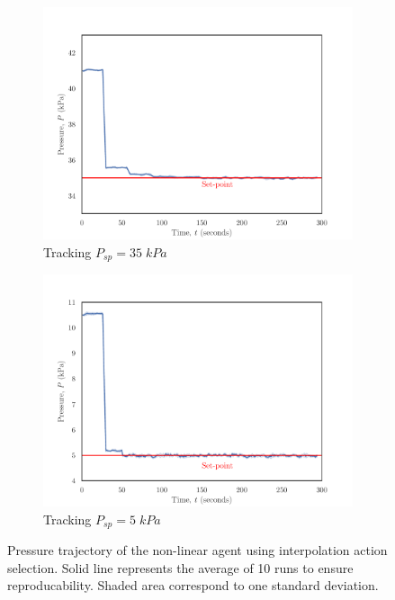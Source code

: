 \begin{figure}[H]
     \centering
     \begin{subfigure}{0.49\textwidth}
         \centering
         \includegraphics[width=\textwidth]{images/ch4/35SP_interpolation.pdf}
         \caption{Tracking $P_{sp} = 35 \; kPa$}
         \label{fig:system1_highsp3}
     \end{subfigure}
     \hfill
     \begin{subfigure}{0.49\textwidth}
         \centering
         \includegraphics[width=\textwidth]{images/ch4/5SP_interpolation.pdf}
         \caption{Tracking $P_{sp} = 5 \; kPa$}
         \label{fig:system1_lowsp3}
     \end{subfigure}
     \caption{Pressure trajectory of the non-linear agent using interpolation action selection. Solid line represents the average of 10 runs to ensure reproducability. Shaded area correspond to one standard deviation.}
\end{figure}

